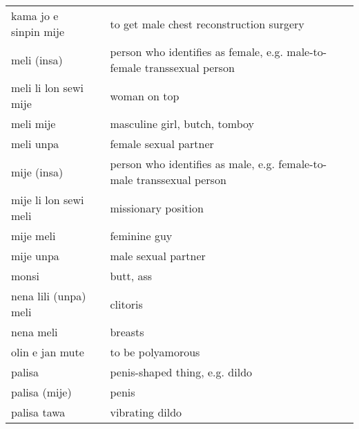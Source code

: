 \begin{supertabular}{p{4,5cm}|ll}
    kama jo e sinpin mije              &  & to get male chest reconstruction surgery                                          \\
    meli (insa)                        &  & person who identifies as female, e.g. male-to-female transsexual person           \\
    meli li lon sewi mije              &  & woman on top                                                                      \\
    meli mije                          &  & masculine girl, butch, tomboy                                                     \\
    meli unpa                          &  & female sexual partner                                                             \\
    mije (insa)                        &  & person who identifies as male, e.g. female-to-male transsexual person             \\
    mije li lon sewi meli              &  & missionary position                                                               \\
    mije meli                          &  & feminine guy                                                                      \\
    mije unpa                          &  & male sexual partner                                                               \\
    monsi                              &  & butt, ass                                                                         \\
    nena lili (unpa) meli              &  & clitoris                                                                          \\
    nena meli                          &  & breasts                                                                           \\
    olin e jan mute                    &  & to be polyamorous                                                                 \\
    palisa                             &  & penis-shaped thing, e.g. dildo                                                    \\
    palisa (mije)                      &  & penis                                                                             \\
    palisa tawa                        &  & vibrating dildo                                                                   \\

\end{supertabular}
